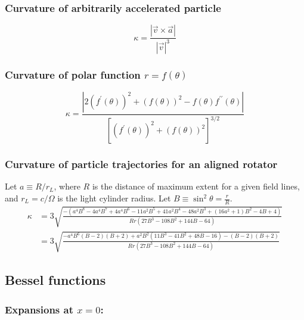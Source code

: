 \documentclass{article}
\begin{document}
\subsubsection{Curvature of arbitrarily accelerated particle}

\begin{equation}
    \kappa = \frac{|\vec{v}\times\vec{a}|}{|\vec{v}|^3}
\end{equation}

\subsubsection{Curvature of polar function $r = f(\theta)$}

\begin{equation}
    \kappa = \frac{|2(f^\prime(\theta))^2 + (f(\theta))^2 - f(\theta)f^{\prime\prime}(\theta)|}{\left[(f^\prime(\theta))^2 + (f(\theta))^2\right]^{3/2}}
\end{equation}

\subsubsection{Curvature of particle trajectories for an aligned rotator}

Let $a \equiv R/r_L$, where $R$ is the distance of maximum extent for a given field lines, and $r_L = c/\Omega$ is the light cylinder radius.
Let $B \equiv \sin^2\theta = \frac{r}{R}$.
\begin{equation}
    \begin{aligned}
        \kappa &= 3\sqrt{
            \frac{-(a^4B^8 - 4a^4B^7 + 4a^4B^6 -
                   11a^2B^5 + 41a^2B^4 - 48a^2B^3 +
                   (16a^2+1)B^2 - 4B + 4)}{
                       Rr(27B^3 - 108B^2 + 144B - 64)}} \\
           &= 3\sqrt{
               \frac{-a^4B^6(B-2)(B+2) +
                   a^2B^2(11B^3 - 41B^2 + 48B - 16) -
                   (B-2)(B+2)}{
                       Rr(27B^3 - 108B^2 + 144B - 64)}}
    \end{aligned}
\end{equation}

\subsection{Bessel functions}

\subsubsection{Expansions at $x=0$:}
\end{document}
